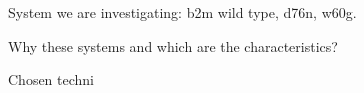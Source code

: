System we are investigating: b2m wild type, d76n, w60g.

Why these systems and which are the characteristics?

Chosen techni